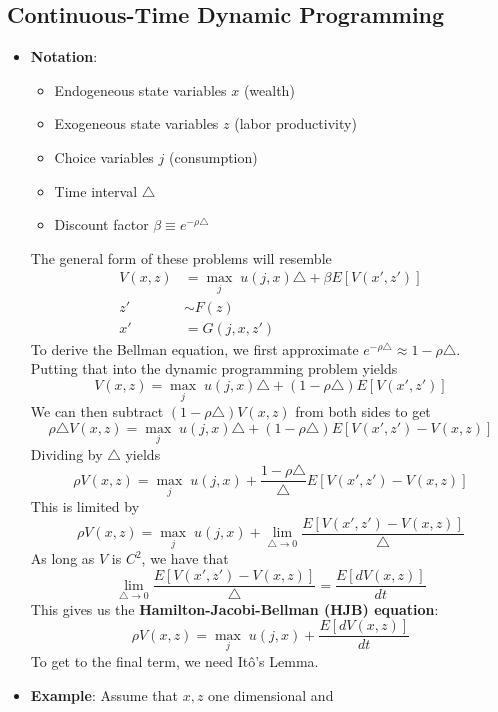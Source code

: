 \documentclass[12pt]{article}
\begin{document}
\subsection{Continuous-Time Dynamic Programming}

\begin{itemize}
    \item \textbf{Notation}:
    \begin{itemize}
        \item Endogeneous state variables $x$ (wealth)
        \item Exogeneous state variables $z$ (labor productivity)
        \item Choice variables $j$ (consumption)
        \item Time interval $\triangle$
        \item Discount factor $\beta \equiv e^{-\rho \triangle}$
    \end{itemize}
    The general form of these problems will resemble
    \[\begin{split}
        V(x,z) &= \max_j\; u(j,x)\triangle + \beta E[V(x',z')] \\
        z' &\sim F(z) \\
        x' &= G(j,x,z')
    \end{split}\]
    To derive the Bellman equation, we first approximate $e^{-\rho \triangle} \approx 1-\rho \triangle$. Putting that into the dynamic programming problem yields
    \[V(x,z) = \max_j\; u(j,x)\triangle + (1-\rho \triangle) E[V(x',z')]\]
    We can then subtract $(1-\rho \triangle)V(x,z)$ from both sides to get
    \[\rho \triangle V(x,z) = \max_j\; u(j,x)\triangle + (1-\rho \triangle) E[V(x',z') - V(x,z)]\]
    Dividing by $\triangle$ yields
    \[\rho V(x,z) = \max_j\; u(j,x) + \frac{1-\rho \triangle}{\triangle} E[V(x',z') - V(x,z)]\]
    This is limited by
    \[\rho V(x,z) = \max_j\; u(j,x) + \lim_{\triangle \to 0}\frac{E[V(x',z') - V(x,z)]}{\triangle}\]
    As long as $V$ is $C^2$, we have that
    \[\lim_{\triangle \to 0}\frac{E[V(x',z') - V(x,z)]}{\triangle} = \frac{E[dV(x,z)]}{dt}\]
    This gives us the \textbf{Hamilton-Jacobi-Bellman (HJB) equation}:
    \begin{equation}\label{HJB}
        \rho V(x,z) = \max_j\; u(j,x) + \frac{E[dV(x,z)]}{dt}
    \end{equation}
    To get to the final term, we need Itô's Lemma.
    \item \textbf{Example}: Assume that $x,z$ one dimensional and
    \[\begin{split}

\end{split}\]
\end{itemize}
\end{document}
